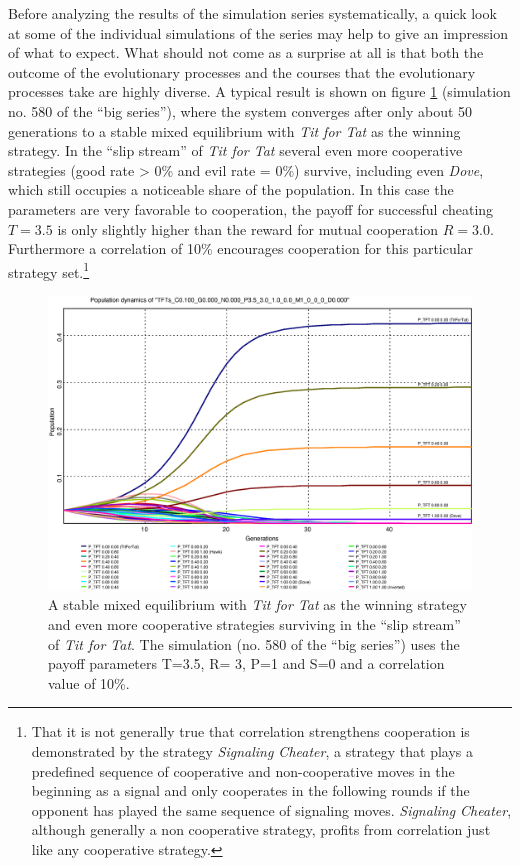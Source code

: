 Before analyzing the results of the simulation series systematically, a quick
look at some of the individual simulations of the series may help to give an
impression of what to expect. What should not come as a surprise at all is
that both the outcome of the evolutionary processes and the courses that the
evolutionary processes take are highly diverse. A typical result is shown on
figure \ref{SimExample1} (simulation no. 580 of the ``big series''), where the
system converges after only about 50
generations to a stable mixed equilibrium with {\em Tit for Tat} as the
winning strategy. In the ``slip stream'' of {\em Tit for Tat} several even
more cooperative strategies (good rate > 0\% and evil rate = 0\%) survive,
including even {\em Dove}, which still occupies a noticeable share of the
population. In this case the parameters are very favorable to cooperation,
the payoff for successful cheating $T=3.5$ is only slightly higher than the
reward for mutual cooperation $R=3.0$.  Furthermore a correlation of 10\%
encourages cooperation for this particular strategy set.\footnote{That it is
  not generally true that correlation strengthens cooperation is demonstrated
  by the strategy {\em Signaling Cheater}, a strategy that plays a predefined
  sequence of cooperative and non-cooperative moves in the beginning as a
  signal and only cooperates in the following rounds if the opponent has
  played the same sequence of signaling moves. {\em Signaling Cheater},
  although generally a non cooperative strategy, profits from correlation just
  like any cooperative strategy.}

\begin{figure}
\begin{center}
\includegraphics[width=20cm]{images/SimulationBS580_refined.eps}
  \caption{\label{SimExample1} A stable mixed equilibrium with
{\em Tit for Tat} as the winning strategy and even more cooperative
    strategies surviving in the ``slip stream'' of {\em Tit for Tat}. The
simulation (no. 580 of the ``big series'') uses the payoff parameters T=3.5, R=
3, P=1 and S=0 and a correlation value of 10\%.}
\end{center}
\end{figure}

